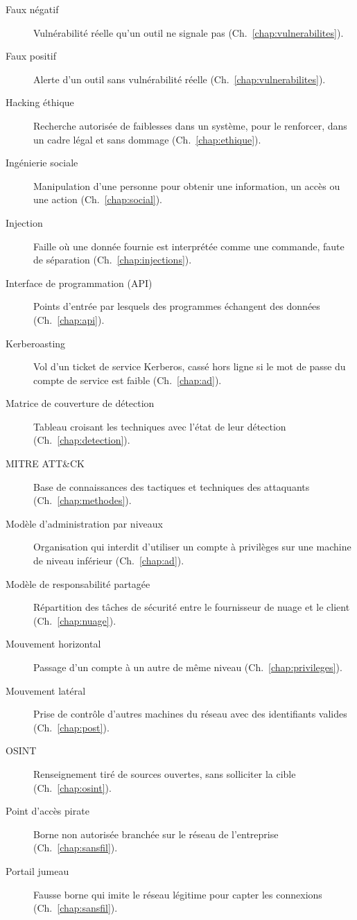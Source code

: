 \begin{description}
    \item[Faux négatif] Vulnérabilité réelle qu'un outil ne signale pas (Ch.~\ref{chap:vulnerabilites}).
    \item[Faux positif] Alerte d'un outil sans vulnérabilité réelle (Ch.~\ref{chap:vulnerabilites}).
    \item[Hacking éthique] Recherche autorisée de faiblesses dans un système, pour le renforcer, dans un cadre légal et sans dommage (Ch.~\ref{chap:ethique}).
    \item[Ingénierie sociale] Manipulation d'une personne pour obtenir une information, un accès ou une action (Ch.~\ref{chap:social}).
    \item[Injection] Faille où une donnée fournie est interprétée comme une commande, faute de séparation (Ch.~\ref{chap:injections}).
    \item[Interface de programmation (API)] Points d'entrée par lesquels des programmes échangent des données (Ch.~\ref{chap:api}).
    \item[Kerberoasting] Vol d'un ticket de service Kerberos, cassé hors ligne si le mot de passe du compte de service est faible (Ch.~\ref{chap:ad}).
    \item[Matrice de couverture de détection] Tableau croisant les techniques avec l'état de leur détection (Ch.~\ref{chap:detection}).
    \item[MITRE ATT\&CK] Base de connaissances des tactiques et techniques des attaquants (Ch.~\ref{chap:methodes}).
    \item[Modèle d'administration par niveaux] Organisation qui interdit d'utiliser un compte à privilèges sur une machine de niveau inférieur (Ch.~\ref{chap:ad}).
    \item[Modèle de responsabilité partagée] Répartition des tâches de sécurité entre le fournisseur de nuage et le client (Ch.~\ref{chap:nuage}).
    \item[Mouvement horizontal] Passage d'un compte à un autre de même niveau (Ch.~\ref{chap:privileges}).
    \item[Mouvement latéral] Prise de contrôle d'autres machines du réseau avec des identifiants valides (Ch.~\ref{chap:post}).
    \item[OSINT] Renseignement tiré de sources ouvertes, sans solliciter la cible (Ch.~\ref{chap:osint}).
    \item[Point d'accès pirate] Borne non autorisée branchée sur le réseau de l'entreprise (Ch.~\ref{chap:sansfil}).
    \item[Portail jumeau] Fausse borne qui imite le réseau légitime pour capter les connexions (Ch.~\ref{chap:sansfil}).

\end{description}
